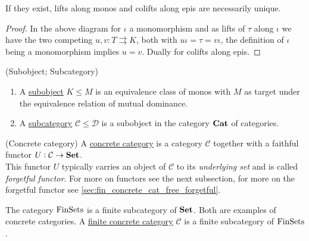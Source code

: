 \begin{remark}
If they exist, lifts along monos and colifts along epis are necessarily unique.
\end{remark}
\begin{proof}
In the above diagram for $\iota$ a monomorphism and as lifts of $\tau$ along $\iota$ we have the two competing
$u, v : T \rightrightarrows K$, both with $u \iota = \tau = v \iota$, the definition of $\iota$ being a monomorphism
implies $u = v$. Dually for colifts along epis.
\end{proof}

\begin{definition}{(Subobject; Subcategory)}
\begin{enumerate}
\renewcommand{\labelenumi}{(\theenumi)}
\item A \ul{subobject} $K \leq M$ is an equivalence class of monos with $M$ as target under the equivalence relation
of mutual dominance.
\item A \ul{subcategory} $\mathcal{C} \leq \mathcal{D}$ is a subobject in the category $\mathrm{\textbf{Cat}}$ of categories.
\end{enumerate}
\end{definition}

\begin{definition}{(Concrete category)}
A \ul{concrete category} is a category $\mathcal{C}$ together with a faithful functor $U : \mathcal{C} \rightarrow \mathrm{\textbf{Set}}$.\\
This functor $U$ typically carries an object of $\mathcal{C}$ to its \textit{underlying set} and is called \textit{forgetful functor}.
For more on functors see the next subsection, for more on the forgetful functor see \ref{sec:fin_concrete_cat_free_forgetful}.
\end{definition}

\begin{definition}
The category $\mathrm{FinSets}$ is a finite subcategory of $\mathrm{\textbf{Set}}$. Both are examples of concrete categories.
A \ul{finite concrete category} $\mathcal{C}$ is a finite subcategory of $\mathrm{FinSets}$.
\end{definition}

